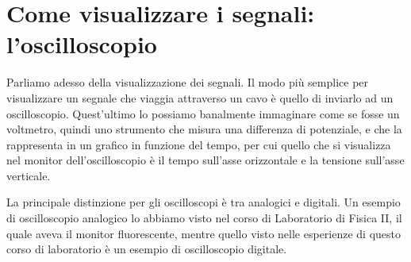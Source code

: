 \section{Come visualizzare i segnali: l'oscilloscopio}

Parliamo adesso della visualizzazione dei segnali. Il modo più semplice per visualizzare un segnale che viaggia attraverso un cavo è quello di inviarlo ad un oscilloscopio. Quest'ultimo lo possiamo banalmente immaginare come se fosse un voltmetro, quindi uno strumento che misura una differenza di potenziale, e che la rappresenta in un grafico in funzione del tempo, per cui quello che si visualizza nel monitor dell'oscilloscopio è il tempo sull'asse orizzontale e la tensione sull'asse verticale.

La principale distinzione per gli oscilloscopi è tra analogici e digitali. Un esempio di oscilloscopio analogico lo abbiamo visto nel corso di Laboratorio di Fisica II, il quale aveva il monitor fluorescente, mentre quello visto nelle esperienze di questo corso di laboratorio è un esempio di oscilloscopio digitale.

